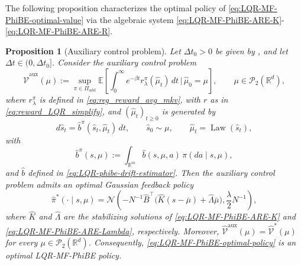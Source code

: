 \documentclass[a4paper, 10pt, english, reqno]{amsart}
\DeclareMathOperator*{\Law}{\text{Law}}
\newtheorem{proposition}[theorem]{Proposition}
\begin{document}
The following proposition characterizes the  optimal policy of \eqref{eq:LQR-MF-PhiBE-optimal-value} via the algebraic system \eqref{eq:LQR-MF-PhiBE-ARE-K}-\eqref{eq:LQR-MF-PhiBE-ARE-R}.
\begin{proposition}[Auxiliary control problem]
\label{prop:LQR-MF-PhiBE-auxiliary-control}
Let $\Delta t_0>0$ be given by
, and let
$\Delta t\in(0,\Delta t_0]$. Consider the auxiliary control problem
\begin{equation}
\label{eq:LQR-MF-PhiBE-auxiliary-value}
  \widehat{\mathcal V}^{\mathrm{aux}}(\mu)
  :=
  \sup_{\pi\in\Pi_{\mathrm{add}}}
  \mathbb E\left[
    \int_0^\infty e^{-\beta t}
    r_\lambda^\pi(\hat\mu_t)\,dt
    \,\bigg|\,
    \hat\mu_0=\mu
  \right],
  \qquad
  \mu\in\mathcal P_2(\mathbb R^d),
\end{equation}
where $r_\lambda^\pi$ is defined in \eqref{eq:reg_reward_avg_mkv}, with $r$ as in \eqref{eq:reward_LQR_simplify}, and $(\hat\mu_t)_{t\ge0}$ is generated by
\begin{equation}
\label{eq:LQR-MF-PhiBE-auxiliary-dynamics}
  d\hat s_t
  =
  \hat b^\pi(\hat s_t,\hat\mu_t)\,dt,
  \qquad
  \hat s_0\sim\mu,
  \qquad
  \hat\mu_t=\Law(\hat s_t),
\end{equation}
with
\[
  \hat b^\pi(s,\mu)
  :=
  \int_{\mathbb R^m}
  \hat b(s,\mu,a)\,\pi(da\mid s,\mu),
\]
and $\hat{b}$ defined in \eqref{eq:LQR-phibe-drift-estimator}. Then the auxiliary control problem admits an optimal Gaussian feedback
policy
\begin{equation}
\label{eq:LQR-MF-PhiBE-optimal-policy}
  \hat\pi^*(\cdot\mid s,\mu)
  =
  \mathcal N\left(
    -N^{-1}\hat B^\top
    \bigl(
      \hat K(s-\bar\mu)+\hat\Lambda\bar\mu
    \bigr),
    \frac{\lambda}{2}N^{-1}
  \right),
\end{equation}
where $\hat K$ and $\hat\Lambda$ are the stabilizing solutions of
\eqref{eq:LQR-MF-PhiBE-ARE-K} and
\eqref{eq:LQR-MF-PhiBE-ARE-Lambda}, respectively. Moreover, $\widehat{\mathcal V}^{\mathrm{aux}}(\mu)=\hat{\mathcal V}^*(\mu)$ for every $\mu\in\mathcal P_2(\mathbb R^d)$. Consequently, \eqref{eq:LQR-MF-PhiBE-optimal-policy} is an optimal LQR-MF-PhiBE policy.
\end{proposition}
\end{document}
